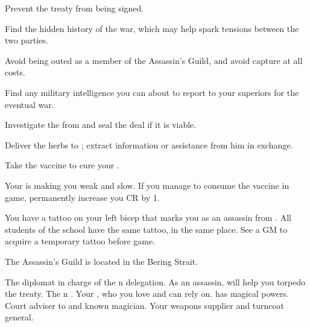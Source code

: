 \documentclass[char]{NeptuneBall}
\begin{document}
\begin{itemz}[Goals]
	\item Prevent the treaty from being signed.
	\item Find the hidden history of the war, which may help spark tensions between the two parties.
	\item Avoid being outed as a member of the Assassin's Guild, and avoid capture at all costs.
  \item Find any military intelligence you can about \pAtlantis{} to report to your superiors for the eventual war.
	\item Investigate the \iPrototype{} from \cGeneral{} and seal the deal if it is viable.
	\item Deliver the herbs to \cManta{}; extract information or assistance from him in exchange.
	\item Take the vaccine to cure your \pPolio{}.
\end{itemz}

\begin{itemz}[Notes]
  \item Your \pPolio{} is making you weak and slow. If you manage to consume the vaccine in game, permanently increase you CR by 1.
	\item You have a tattoo on your left bicep that marks you as an assassin from \pAssassin{}. All students of the school have the same tattoo, in the same place. See a GM to acquire a temporary tattoo before game.
\end{itemz}

\begin{itemz}[Trivia]
  \item The Assassin's Guild is located in the Bering Strait.
\end{itemz}

\begin{contacts}
	\contact{\cDiplomat{}} The diplomat in charge of the \pPacifica{}n delegation. As an assassin, \cDiplomat{\they} will help you torpedo the treaty.
	\contact{\cPrince{}} The \pPacifica{}n \cPrince{\Prince}.
  \contact{\cBodyguard{}} Your \cSpy{\sibling}, who you love and can rely on. \cBodyguard{\They} has magical powers.
	\contact{\cManta{}} Court adviser to \cKing{\King} \cKing{} and known magician.
	\contact{\cGeneral{}} Your weapons supplier and turncoat general.
\end{contacts}
\end{document}
